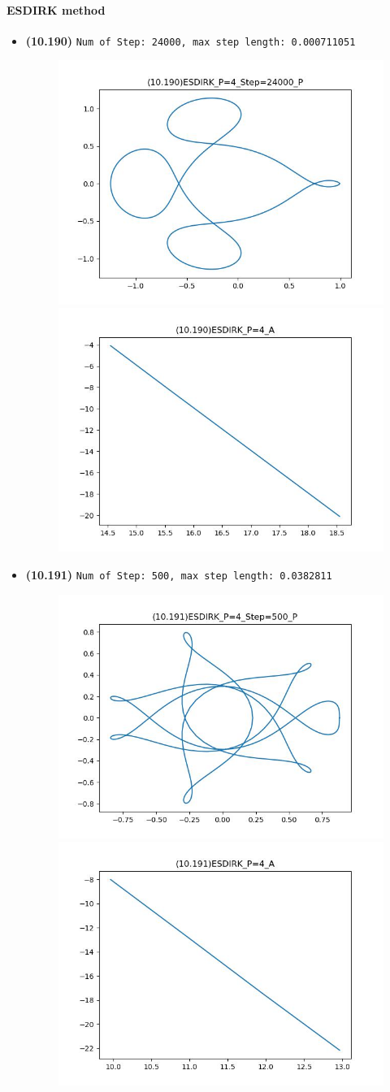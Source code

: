 \documentclass{article}
\begin{document}
\paragraph{ESDIRK method}

\begin{itemize}
    \item \textbf{(10.190)} \verb|Num of Step: 24000, max step length: 0.000711051|
    \begin{figure}[h]
        \centering
        \includegraphics[width = 0.45\linewidth]{(10.190)ESDIRK_P=4_Step=24000_P.jpg}
        \includegraphics[width = 0.45\linewidth]{(10.190)ESDIRK_P=4_A.jpg}
    \end{figure}
    \item \textbf{(10.191)} \verb|Num of Step: 500, max step length: 0.0382811|
    \begin{figure}[h]
        \centering
        \includegraphics[width = 0.45\linewidth]{(10.191)ESDIRK_P=4_Step=500_P.jpg}
        \includegraphics[width = 0.45\linewidth]{(10.191)ESDIRK_P=4_A.jpg}
    \end{figure}
\end{itemize}
\end{document}
